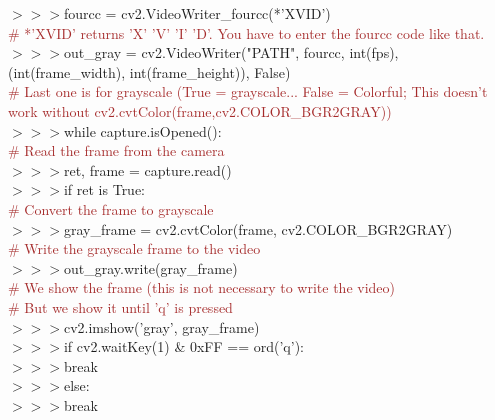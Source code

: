 \documentclass[a4paper,18pt]{article}
\begin{document}
{{{{{{{{{{{{{{{{{{{\hspace*{14pt}$>>>$fourcc = cv2.VideoWriter\_fourcc(*'XVID')\\{\textcolor{brown}{\# *'XVID' returns 'X' 'V' 'I' 'D'. You have to enter the fourcc code like that.}}\\
\hspace*{14pt}$>>>$out\_gray = cv2.VideoWriter("PATH", fourcc, int(fps), (int(frame\_width), int(frame\_height)), False)\\{\textcolor{brown}{\# Last one is for grayscale (True = grayscale... False = Colorful; This doesn't work without cv2.cvtColor(frame,cv2.COLOR\_BGR2GRAY))}\\


\hspace*{14pt}$>>>$while capture.isOpened():\\
{\textcolor{brown}{\# Read the frame from the camera}\\
\hspace*{14pt}$>>>$\hspace*{28pt}ret, frame = capture.read()\\
\hspace*{14pt}$>>>$\hspace*{28pt}if ret is True:\\

{\textcolor{brown}{\# Convert the frame to grayscale}\\
\hspace*{14pt}$>>>$\hspace*{42pt}gray\_frame = cv2.cvtColor(frame, cv2.COLOR\_BGR2GRAY)\\
{\textcolor{brown}{\# Write the grayscale frame to the video}\\
\hspace*{14pt}$>>>$\hspace*{42pt}out\_gray.write(gray\_frame)\\
{\textcolor{brown}{\# We show the frame (this is not necessary to write the video)}\\
{\textcolor{brown}{\# But we show it until 'q' is pressed}\\
\hspace*{14pt}$>>>$\hspace*{42pt}cv2.imshow('gray', gray\_frame)\\
\hspace*{14pt}$>>>$\hspace*{42pt}if cv2.waitKey(1) \& 0xFF == ord('q'):\\
\hspace*{14pt}$>>>$\hspace*{56pt}break\\
\hspace*{14pt}$>>>$\hspace*{42pt}else:\\
\hspace*{14pt}$>>>$\hspace*{56pt}break\\

}}}}}}}}}}}}}}}}}}}}}}}}}
\end{document}
